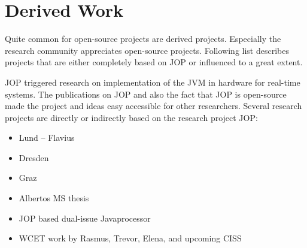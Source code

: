 \section{Derived Work}
\label{sec:derived}

Quite common for open-source projects are derived projects.
Especially the research community appreciates open-source projects.
Following list describes projects that are either completely based
on JOP or influenced to a great extent.

JOP triggered research on implementation of the JVM in hardware for
real-time systems. The publications on JOP and also the fact that
JOP is open-source made the project and ideas easy accessible for
other researchers. Several research projects are directly or
indirectly based on the research project JOP:

\begin{itemize}
    \item Lund -- Flavius
    \item Dresden
    \item Graz
    \item Albertos MS thesis
    \item \cite{conf/iscas/KoT07} JOP based dual-issue Javaprocessor
    \item WCET work by Rasmus, Trevor, Elena, and upcoming CISS
\end{itemize}
